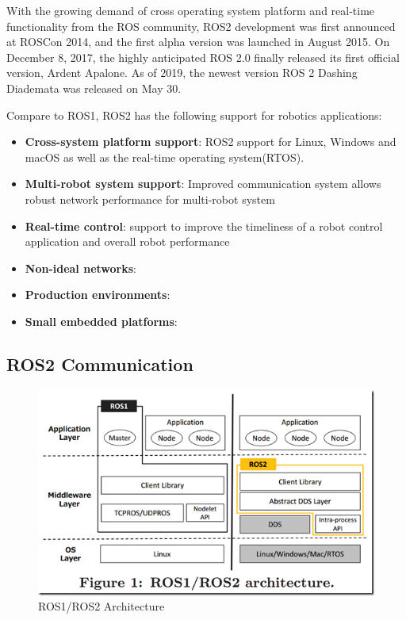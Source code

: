\documentclass[letterpaper, 10 pt, conference]{ieeeconf}  %
\begin{document}
With the growing demand of cross operating system platform and real-time functionality from the ROS community, ROS2 development was first announced at ROSCon 2014, and the first alpha version was launched in August 2015. On December 8, 2017, the highly anticipated ROS 2.0 finally released its first official version, Ardent Apalone. As of 2019, the newest version ROS 2 Dashing Diademata was released on May 30.

Compare to ROS1, ROS2 has the following support for robotics applications: 
\begin{itemize}
  \item \textbf{Cross-system platform support}: ROS2 support for Linux, Windows and macOS as well as the real-time operating system(RTOS).
  \item \textbf{Multi-robot system support}: Improved communication system allows robust network performance for multi-robot system 
  \item \textbf{Real-time control}: support to improve the timeliness of a robot control application and overall robot performance
  \item \textbf{Non-ideal networks}:
  \item \textbf{Production environments}:
  \item \textbf{Small embedded platforms}:
\end{itemize}

\subsection{ROS2 Communication}
\begin{figure}[ht]
  \includegraphics[width=\linewidth]{ros1_ros2_architecture.png}
  \caption{ROS1/ROS2 Architecture \cite{c1}} 
  \label{fig:ros2_architecture}
\end{figure}
\end{document}
